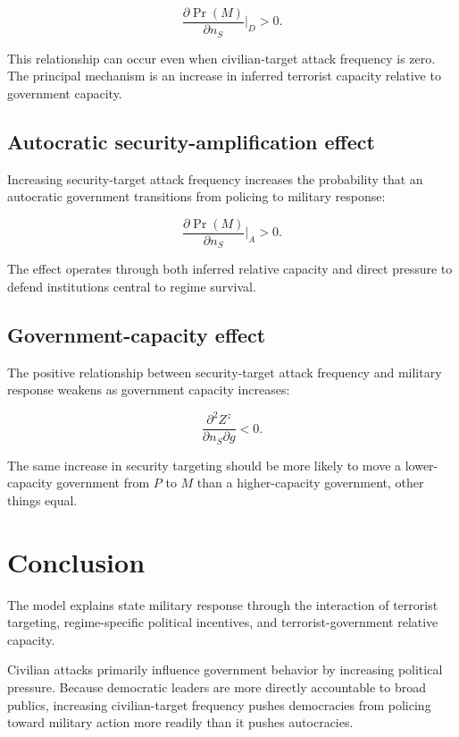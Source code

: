 \documentclass[
  letterpaper,
  DIV=11,
  numbers=noendperiod]{scrartcl}
\begin{document}
\[
\boxed{
\frac{\partial\Pr(M)}{\partial n_S}\bigg|_D>0.
}
\]

This relationship can occur even when civilian-target attack frequency
is zero. The principal mechanism is an increase in inferred terrorist
capacity relative to government capacity.

\subsection{Autocratic security-amplification
effect}\label{autocratic-security-amplification-effect}

Increasing security-target attack frequency increases the probability
that an autocratic government transitions from policing to military
response:

\[
\boxed{
\frac{\partial\Pr(M)}{\partial n_S}\bigg|_A>0.
}
\]

The effect operates through both inferred relative capacity and direct
pressure to defend institutions central to regime survival.

\subsection{Government-capacity
effect}\label{government-capacity-effect}

The positive relationship between security-target attack frequency and
military response weakens as government capacity increases:

\[
\boxed{
\frac{\partial^2 Z^z}{\partial n_S\partial g}<0.
}
\]

The same increase in security targeting should be more likely to move a
lower-capacity government from \(P\) to \(M\) than a higher-capacity
government, other things equal.

\section{Conclusion}\label{conclusion}

The model explains state military response through the interaction of
terrorist targeting, regime-specific political incentives, and
terrorist-government relative capacity.

Civilian attacks primarily influence government behavior by increasing
political pressure. Because democratic leaders are more directly
accountable to broad publics, increasing civilian-target frequency
pushes democracies from policing toward military action more readily
than it pushes autocracies.
\end{document}
